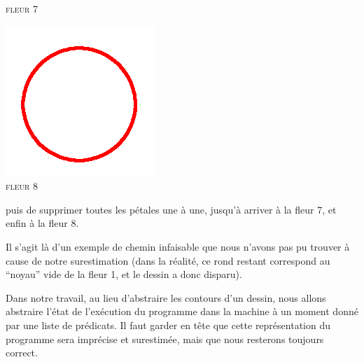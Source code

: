 \documentclass[french]{article}
\begin{document}
\begin{center}
\begin{minipage}{.3\textwidth}
\begin{center}
	\textsc{fleur 7}
      \end{center}
    \end{minipage}
    \begin{minipage}{.3\textwidth}
      \begin{center}
	\includegraphics[scale=0.19]{./pictures/flower9.png}\\
	\textsc{fleur 8}
      \end{center}
    \end{minipage}
  \end{center}
  
  puis de supprimer toutes les pétales une à une, jusqu'à arriver à la fleur 7, et enfin à la fleur 8.
  
  Il s'agit là d'un exemple de chemin infaisable que nous n'avons pas pu trouver à cause de notre surestimation (dans la réalité, ce rond restant correspond au ``noyau'' vide de la fleur 1, et le dessin a donc disparu).
  
  \bigbreak
  
  Dans notre travail, au lieu d'abstraire les contours d'un dessin, nous allons abstraire l'état de l'exécution du programme dans la machine à un moment donné par une liste de prédicats. Il faut garder en tête que cette représentation du programme sera imprécise et surestimée, mais que nous resterons toujours correct.
  
  
  
  
\end{document}
